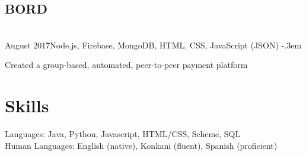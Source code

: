 \documentclass{article}
\let\olditemize=\itemize \let\endolditemize=\enditemize
\renewenvironment{itemize}{\olditemize[topsep=0em] \itemsep-.3em}{\endolditemize}
\newcommand{\entry}[3]{\quad\textbf{#1}\\#2\qquad#3}
\begin{document}
\subsection{BORD}
\entry{}{August 2017}{Node.js, Firebase, MongoDB, HTML, CSS, JavaScript (JSON)}
\begin{itemize}
  \item Created a group-based, automated, peer-to-peer payment platform
\end{itemize}



\section{Skills}
Languages:
  Java, Python, Javascript, HTML/CSS, Scheme, SQL \\
Human Languages:
  English (native), Konkani (fluent), Spanish (proficient)
\end{document}
